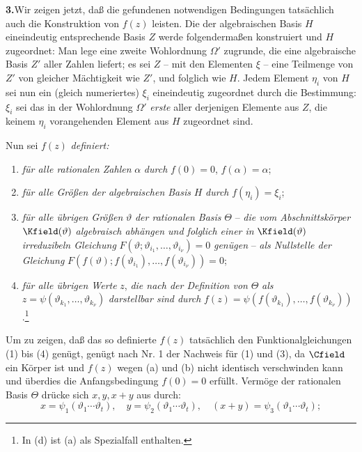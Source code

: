 \medskip
\noindent\textbf{3.}\quad Wir zeigen jetzt, daß die gefundenen notwendigen Bedingungen tatsächlich auch die Konstruktion von \(f(z)\) leisten. Die der algebraischen Basis \(H\) eineindeutig entsprechende Basis \(Z\) werde folgendermaßen konstruiert und \(H\) zugeordnet: Man lege eine zweite Wohlordnung \(\Omega'\) zugrunde, die eine algebraische Basis \(Z'\) aller Zahlen liefert; es sei \(Z\) -- mit den Elementen \(\xi\) -- eine Teilmenge von \(Z'\) von gleicher Mächtigkeit wie \(Z'\), und folglich wie \(H\). Jedem Element \(\eta_i\) von \(H\) sei nun ein (gleich numeriertes) \(\xi_i\) eineindeutig zugeordnet durch die Bestimmung: \(\xi_i\) sei das in der Wohlordnung \(\Omega'\) \emph{erste} aller derjenigen Elemente aus \(Z\), die keinem \(\eta_i\) vorangehenden Element aus \(H\) zugeordnet sind.

Nun sei \(f(z)\) \emph{definiert:}
\begin{enumerate}
\item[(a)] \emph{für alle rationalen Zahlen} \(\alpha\) \emph{durch} \(f(0)=0\), \(f(\alpha)=\alpha\);
\item[(b)] \emph{für alle Größen der algebraischen Basis} \(H\) \emph{durch} \(f(\eta_i)=\xi_i\);
\item[(c)] \emph{für alle übrigen Größen} \(\vartheta\) \emph{der rationalen Basis} \(\Theta\) -- \emph{die vom Abschnittskörper} \(\Kfield(\vartheta)\) \emph{algebraisch abhängen und folglich einer in} \(\Kfield(\vartheta)\) \emph{irreduzibeln Gleichung} \(F(\vartheta;\vartheta_{i_1},\ldots,\vartheta_{i_\nu})=0\) \emph{genügen} -- \emph{als Nullstelle der Gleichung} \(F(f(\vartheta);f(\vartheta_{i_1}),\ldots,f(\vartheta_{i_\nu}))=0\);
\item[(d)] \emph{für alle übrigen Werte} \(z\), \emph{die nach der Definition von} \(\Theta\) \emph{als} \(z=\psi(\vartheta_{k_1},\ldots,\vartheta_{k_\nu})\) \emph{darstellbar sind durch} \(f(z)=\psi(f(\vartheta_{k_1}),\ldots,f(\vartheta_{k_\nu}))\).\footnote{In (d) ist (a) als Spezialfall enthalten.}
\end{enumerate}
Um zu zeigen, daß das so definierte \(f(z)\) tatsächlich den Funktionalgleichungen (1) bis (4) genügt, genügt nach Nr. 1 der Nachweis für (1) und (3), da \(\Cfield\) ein Körper ist und \(f(z)\) wegen (a) und (b) nicht identisch verschwinden kann und überdies die Anfangsbedingung \(f(0)=0\) erfüllt. Vermöge der rationalen Basis \(\Theta\) drücke sich \(x,y,x+y\) aus durch:
\[
x=\psi_1(\vartheta_1\cdots\vartheta_t),\quad
 y=\psi_2(\vartheta_1\cdots\vartheta_t),\quad
 (x+y)=\psi_3(\vartheta_1\cdots\vartheta_t);
\]
